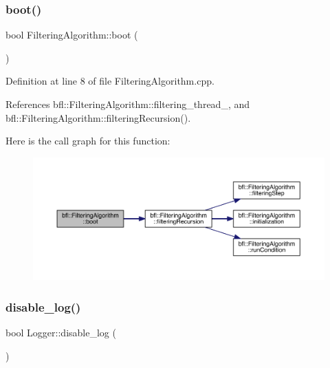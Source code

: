 \subsubsection{\texorpdfstring{boot()}{boot()}}
{\footnotesize\ttfamily bool Filtering\+Algorithm\+::boot (\begin{DoxyParamCaption}{ }\end{DoxyParamCaption})\hspace{0.3cm}{\ttfamily [inherited]}}



Definition at line 8 of file Filtering\+Algorithm.\+cpp.



References bfl\+::\+Filtering\+Algorithm\+::filtering\+\_\+thread\+\_\+, and bfl\+::\+Filtering\+Algorithm\+::filtering\+Recursion().

Here is the call graph for this function\+:
\nopagebreak
\begin{figure}[H]
\begin{center}
\leavevmode
\includegraphics[width=350pt]{classbfl_1_1FilteringAlgorithm_a96651f8464190c0a56d79219a1017147_cgraph}
\end{center}
\end{figure}
\mbox{\label{classbfl_1_1Logger_a440467a28ccc46490d767fe0ef6f556a}} 
\subsubsection{\texorpdfstring{disable\+\_\+log()}{disable\_log()}}
{\footnotesize\ttfamily bool Logger\+::disable\+\_\+log (\begin{DoxyParamCaption}{ }\end{DoxyParamCaption})\hspace{0.3cm}{\ttfamily [inherited]}}



